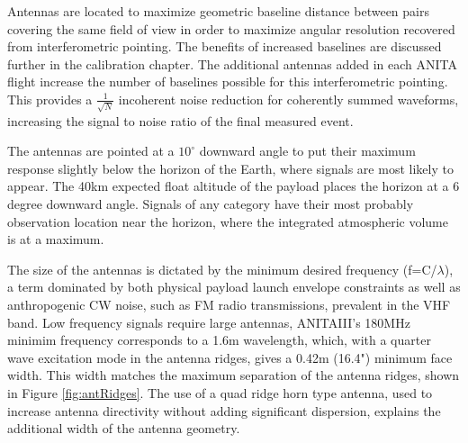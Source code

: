 	Antennas are located to maximize geometric baseline distance between pairs covering the same field of view in order to maximize angular resolution recovered from interferometric pointing.  The benefits of increased baselines are discussed further in the calibration chapter.  The additional antennas added in each ANITA flight increase the number of baselines possible for this interferometric pointing. This provides a $\frac{1}{\sqrt{N}}$ incoherent noise reduction for coherently summed waveforms, increasing the signal to noise ratio of the final measured event.  
	
	The antennas are pointed at a $10^{\circ}$ downward angle to put their maximum response slightly below the horizon of the Earth, where signals are most likely to appear.  The 40km expected float altitude of the payload places the horizon at a 6 degree downward angle.  Signals of any category have their most probably observation location near the horizon, where the integrated atmospheric volume is at a maximum.
	
	The size of the antennas is dictated by the minimum desired frequency (f=C/$\lambda$), a term dominated by both physical payload launch envelope constraints as well as anthropogenic CW noise, such as FM radio transmissions, prevalent in the VHF band. Low frequency signals require large antennas, ANITAIII's 180MHz minimim frequency corresponds to a 1.6m wavelength, which, with a quarter wave excitation mode in the antenna ridges, gives a 0.42m (16.4") minimum face width.  This width matches the maximum separation of the antenna ridges, shown in Figure \ref{fig:antRidges}.  The use of a quad ridge horn type antenna, used to increase antenna directivity without adding significant dispersion, explains the additional width of the antenna geometry.
	
